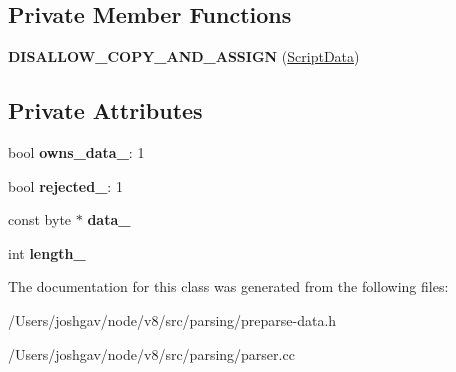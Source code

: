 \subsection*{Private Member Functions}
\begin{DoxyCompactItemize}
\item 
{\bfseries D\+I\+S\+A\+L\+L\+O\+W\+\_\+\+C\+O\+P\+Y\+\_\+\+A\+N\+D\+\_\+\+A\+S\+S\+I\+GN} (\hyperlink{classv8_1_1internal_1_1_script_data}{Script\+Data})\hypertarget{classv8_1_1internal_1_1_script_data_addd6f6e5e33745bbe36d7212f51f6077}{}\label{classv8_1_1internal_1_1_script_data_addd6f6e5e33745bbe36d7212f51f6077}

\end{DoxyCompactItemize}
\subsection*{Private Attributes}
\begin{DoxyCompactItemize}
\item 
bool {\bfseries owns\+\_\+data\+\_\+}\+: 1\hypertarget{classv8_1_1internal_1_1_script_data_a7581adc704f86e66ffafa2f33c97d2fe}{}\label{classv8_1_1internal_1_1_script_data_a7581adc704f86e66ffafa2f33c97d2fe}

\item 
bool {\bfseries rejected\+\_\+}\+: 1\hypertarget{classv8_1_1internal_1_1_script_data_abbf9edfc5af14c7b8f7a5a6fb4154b2c}{}\label{classv8_1_1internal_1_1_script_data_abbf9edfc5af14c7b8f7a5a6fb4154b2c}

\item 
const byte $\ast$ {\bfseries data\+\_\+}\hypertarget{classv8_1_1internal_1_1_script_data_a67e11e1c2abf8b740f951c1bb0d62a40}{}\label{classv8_1_1internal_1_1_script_data_a67e11e1c2abf8b740f951c1bb0d62a40}

\item 
int {\bfseries length\+\_\+}\hypertarget{classv8_1_1internal_1_1_script_data_a75a7194b154a03924f334d0f2cc02fc6}{}\label{classv8_1_1internal_1_1_script_data_a75a7194b154a03924f334d0f2cc02fc6}

\end{DoxyCompactItemize}


The documentation for this class was generated from the following files\+:\begin{DoxyCompactItemize}
\item 
/\+Users/joshgav/node/v8/src/parsing/preparse-\/data.\+h\item 
/\+Users/joshgav/node/v8/src/parsing/parser.\+cc\end{DoxyCompactItemize}
